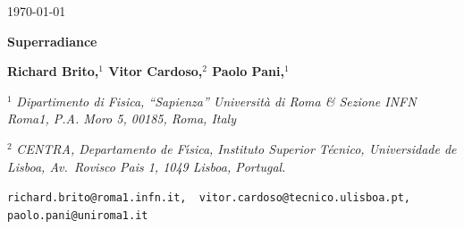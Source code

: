 \documentclass[11pt]{article}
\numberwithin{equation}{section} %
\begin{document}
%
% 
%

\pagestyle{plain}
\setcounter{page}{1}

\begin{titlepage}

\begin{center}
\vspace*{-1cm} \today 

\vskip 2.0cm

{\huge {\bf Superradiance}}



\vskip 14mm

{\large  {\bf Richard Brito,$^{1}$ Vitor Cardoso,$^{2}$ Paolo Pani,$^{1}$}}

\vspace{0.5 cm}

 ${}^1$ {\it Dipartimento di Fisica, ``Sapienza'' Universit\`a di Roma \& Sezione INFN Roma1, P.A. Moro 5, 00185, Roma, 
Italy}

${}^2$ {\it CENTRA, Departamento de F\'{\i}sica, Instituto Superior
   T\'ecnico, Universidade de Lisboa, Av.~Rovisco Pais 1, 1049
   Lisboa, Portugal.}
    
     

{\tt  richard.brito@roma1.infn.it,\, vitor.cardoso@tecnico.ulisboa.pt, \, paolo.pani@uniroma1.it}

\vspace{5mm}


\end{center}
\end{titlepage}
\end{document}
